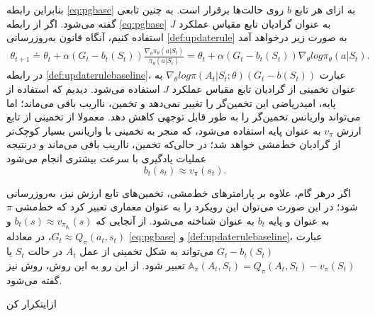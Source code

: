 بنابراین رابطه 
\ref{eq:pgbase}
به ازای هر تابع $b$ روی حالت‌ها برقرار است. به چنین تابعی 
\textit{}
 گفته می‌شود. اگر از رابطه
  \ref{eq:pgbase}
  به عنوان گرادیان تابع مقیاس عملکرد $J$ استفاده کنیم، آنگاه قانون به‌روزرسانی 
  \ref{def:updaterule}
  به صورت زیر درخواهد آمد
\begin{align}
\theta_{t+1} \doteq \theta_t + \alpha (G_t - b_t(S_t)) \frac{\nabla_\theta \pi_\theta (a|S_t)}{\pi_\theta (a|S_t)} = \theta_t + \alpha (G_t- b_t(S_t)) \nabla_\theta log \pi_\theta (a|S_t).
\label{def:updaterulebaseline}
\end{align}
در رابطه 
\ref{def:updaterulebaseline}،
عبارت 
$\nabla_\theta  log  \pi(A_t|S_t;\theta) (G_t - b(S_t))$
به عنوان تخمینی از گرادیان تابع مقیاس عملکرد $J$ استفاده می‌شود. دیدیم که استفاده از پایه، امیدریاضی این تخمین‌گر را  تغییر نمی‌دهد و تخمین، نااریب باقی می‌ماند؛ اما می‌تواند واریانس تخمین‌گر را به طور قابل توجهی کاهش دهد. معمولا از تخمینی از تابع ارزش $v_\pi$ به عنوان پایه استفاده می‌شود،
که منجر به تخمینی با واریانس بسیار کوچک‌تر از گرادیان خط‌مشی خواهد شد؛ در حالی‌که تخمین، نااریب باقی می‌ماند و درنتیجه عملیات یادگیری با سرعت بیشتری انجام می‌شود
$$b_t(s_t) \approx v_\pi (s_t).$$

اگر درهر گام، علاوه بر پارامترهای خط‌مشی، تخمین‌های تابع ارزش نیز، به‌روزرسانی شود؛  در این صورت می‌توان این رویکرد را به عنوان معماری 
\textit{}
 تعبیر کرد که خط‌مشی $\pi$  به عنوان  و پایه $b_t$ به عنوان   شناخته می‌شود.
از آنجایی که
$b_t(s) \approx v_{\pi_{\theta_t}}(s)$
و
$G_t \approx Q_\pi (a_t, s_t)$،
در معادله 
\ref{eq:pgbase} و
\ref{def:updaterulebaseline}،
عبارت
$G_t - b_t(S_t)$
می‌تواند به شکل تخمینی از
\textit{}
 عمل $A_t$ در حالت $S_t$ یا 
$\mathbb{A}_\pi(A_t,S_t)=Q_\pi(A_t,S_t)-v_\pi(S_t)$
 تعبیر شود. از این رو به این روش، روش 
\textit{
}
نیز گفته می‌شود.

‌ازای{تکرار کن}

